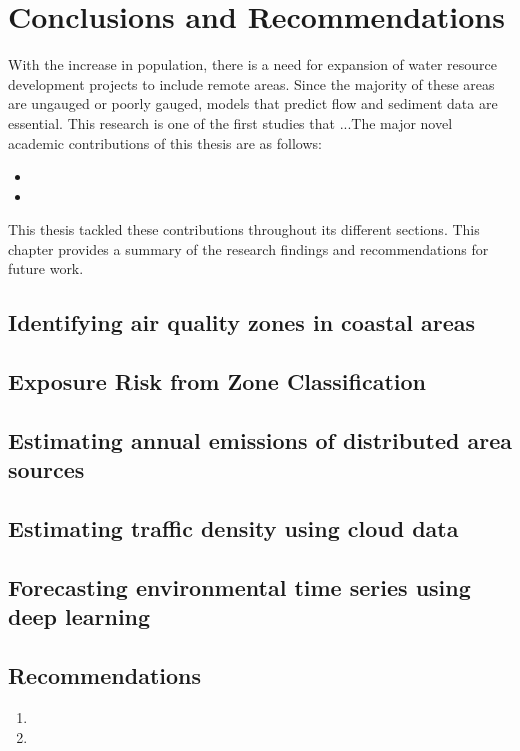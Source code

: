 \chapter{Conclusions and Recommendations}

With the increase in population, there is a need for expansion of water resource development projects to include remote areas. Since the majority of these areas are ungauged or poorly gauged, models that predict flow and sediment data are essential.  This research is one of the first studies that ...The major novel academic contributions of this thesis are as follows:

\begin{itemize}
\item 
\item 
\end{itemize}

This thesis tackled these contributions throughout its different sections. This chapter provides a summary of the research findings and recommendations for future work.

\section{Identifying air quality zones in coastal areas}

\section{Exposure Risk from Zone Classification}

\section{Estimating annual emissions of distributed area sources}

\section{Estimating traffic density using cloud data}

\section{Forecasting environmental time series using deep learning}


\section{Recommendations}

\begin{enumerate}
\item
\item  
\end{enumerate}


